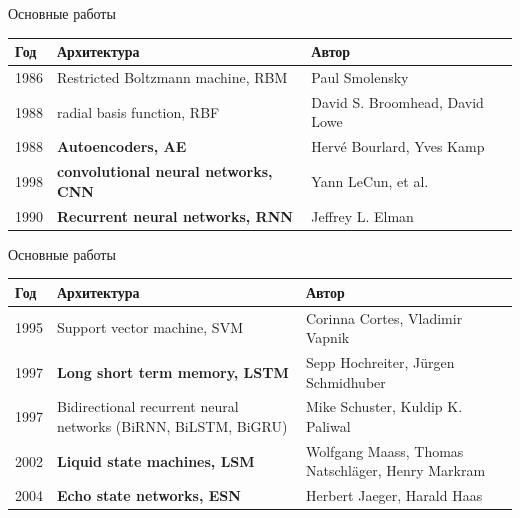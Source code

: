 \documentclass{beamer}
\begin{document}
\begin{frame}{Основные работы}
\begin{center}
\begin{tabular}{|p{0.4in}|p{1.5in}|p{1.3in}|}\hline
\textbf{Год}& \textbf{Архитектура} & \textbf{Автор} \\
\hline
1986 & R\textsf{estricted Boltzmann machine, RBM} & Paul Smolensky \\\hline
1988 & \textsf{radial basis function, RBF} & David S. Broomhead, David Lowe \\\hline
1988 & \textbf{Autoencoders, AE} & Hervé Bourlard, Yves Kamp \\\hline
1998 & \textbf{convolutional neural networks, CNN} & Yann LeCun, et al. \\\hline
1990 & \textbf{Recurrent neural networks, RNN} & Jeffrey L. Elman \\\hline
\end{tabular}
\end{center}
\end{frame}

\begin{frame}{Основные работы}
\begin{center}
\begin{tabular}{|p{0.4in}|p{1.5in}|p{1.3in}|}\hline
\textbf{Год}& \textbf{Архитектура} & \textbf{Автор} \\
\hline
1995 & \textsf{Support vector machine, SVM} & Corinna Cortes, Vladimir Vapnik \\\hline
1997 & \textbf{Long short term memory, LSTM} & Sepp Hochreiter, Jürgen Schmidhuber \\\hline
1997 & \textsf{Bidirectional recurrent neural networks (BiRNN, BiLSTM, BiGRU)} & Mike Schuster, Kuldip K. Paliwal \\\hline
2002 & \textbf{Liquid state machines, LSM} & Wolfgang Maass, Thomas Natschläger, Henry Markram \\\hline
2004 & \textbf{Echo state networks, ESN} & Herbert Jaeger, Harald Haas \\\hline
\end{tabular}
\end{center}
\end{frame}
\end{document}
